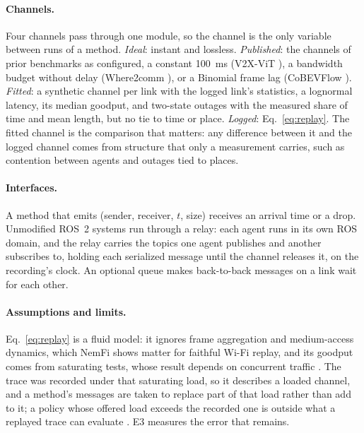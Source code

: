 \paragraph{Channels.} Four channels pass through one module, so the
channel is the only variable between runs of a method. \emph{Ideal}:
instant and lossless. \emph{Published}: the channels of prior benchmarks
as configured, a constant \SI{100}{\milli\second} (V2X-ViT \cite{v2xvit}),
a bandwidth budget without delay (Where2comm \cite{where2comm}), or a
Binomial frame lag (CoBEVFlow \cite{wei2023cobevflow}). \emph{Fitted}: a
synthetic channel per link with the logged link's statistics, a
lognormal latency, its median goodput, and two-state outages with the
measured share of time and mean length, but no tie to time or place.
\emph{Logged}: Eq.~\eqref{eq:replay}. The fitted channel is the
comparison that matters: any difference between it and the logged
channel comes from structure that only a measurement carries, such as
contention between agents and outages tied to places.

\paragraph{Interfaces.} A method that emits (sender, receiver, $t$,
size) receives an arrival time or a drop. Unmodified ROS~2 systems run
through a relay: each agent runs in its own ROS domain, and the relay
carries the topics one agent publishes and another subscribes to,
holding each serialized message until the channel releases it, on the
recording's clock. An optional queue makes back-to-back messages on a
link wait for each other.

\paragraph{Assumptions and limits.} Eq.~\eqref{eq:replay} is a fluid
model: it ignores frame aggregation and medium-access dynamics, which
NemFi \cite{nemfi} shows matter for faithful Wi-Fi replay, and its
goodput comes from saturating tests, whose result depends on concurrent
traffic \cite{syed2020wifiemu}. The trace was recorded under that
saturating load, so it describes a loaded channel, and a method's
messages are taken to replace part of that load rather than add to it; a
policy whose offered load exceeds the recorded one is outside what a
replayed trace can evaluate \cite{causalsim}. E3 measures the error that
remains.
